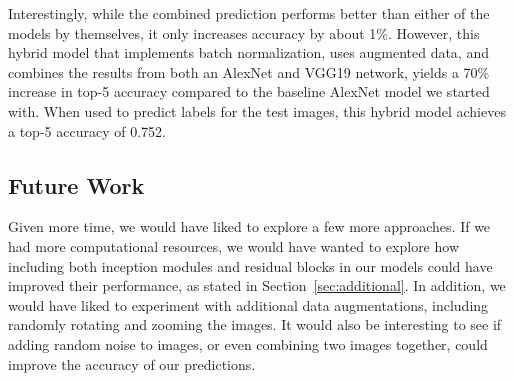 \documentclass[10pt,twocolumn,letterpaper]{article}
\begin{document}
Interestingly, while the combined prediction performs better than either of the models by themselves, it only increases accuracy by about 1\%. However, this hybrid model that implements batch normalization, uses augmented data, and combines the results from both an AlexNet and VGG19 network, yields a 70\% increase in top-5 accuracy compared to the baseline AlexNet model we started with. When used to predict labels for the test images, this hybrid model achieves a top-5 accuracy of 0.752.

\subsection{Future Work}

Given more time, we would have liked to explore a few more approaches. If we had more computational resources, we would have wanted to explore how including both inception modules and residual blocks in our models could have improved their performance, as stated in Section~\ref{sec:additional}. In addition, we would have liked to experiment with additional data augmentations, including randomly rotating and zooming the images. It would also be interesting to see if adding random noise to images, or even combining two images together, could improve the accuracy of our predictions.


{\small


}
\end{document}
